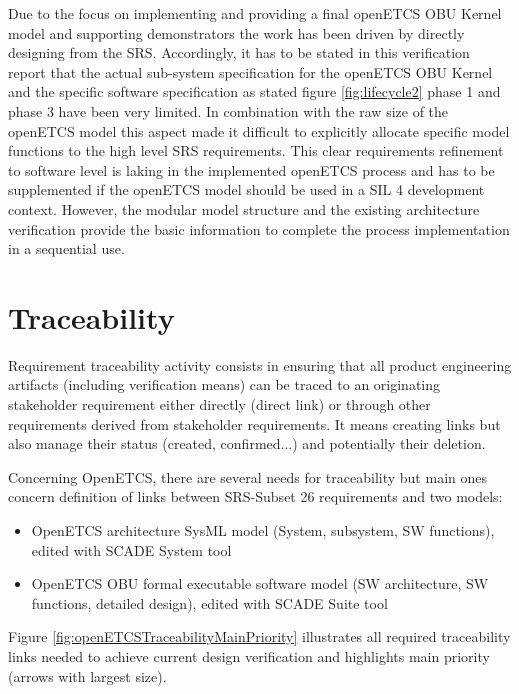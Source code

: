 \documentclass{template/openetcs_report}
\begin{document}
Due to the focus on implementing and providing a final openETCS OBU Kernel model and supporting demonstrators the work has been driven by directly designing from the SRS. Accordingly, it has to be stated in this verification report that the actual sub-system specification for the openETCS OBU Kernel and the specific software specification as stated figure \ref{fig:lifecycle2} phase 1 and phase 3 have been very limited. In combination with the raw size of the openETCS model this aspect made it difficult to explicitly allocate specific model functions to the high level SRS requirements. This clear requirements refinement to software level is laking in the implemented openETCS process and has to be supplemented if the openETCS model should be used in a SIL 4 development context. However, the modular model structure and the existing architecture verification provide the basic information to complete the process implementation in a sequential use.

\section{Traceability}

Requirement traceability activity consists in ensuring that all product engineering artifacts (including verification means) can be traced to an originating stakeholder requirement either directly (direct link) or through other requirements derived from stakeholder requirements. It means creating links but also manage their status (created, confirmed...) and potentially their deletion.

Concerning OpenETCS, there are several needs for traceability but main ones concern definition of links between SRS-Subset 26 requirements and two models:
\begin{itemize}
\item OpenETCS architecture SysML model (System, subsystem, SW functions), edited with SCADE System tool
\item OpenETCS OBU formal executable software model (SW architecture, SW functions, detailed design), edited with SCADE Suite tool
\end{itemize}

Figure \ref{fig:openETCSTraceabilityMainPriority} illustrates all required traceability links needed to achieve current design verification and highlights main priority (arrows with largest size).
\end{document}
